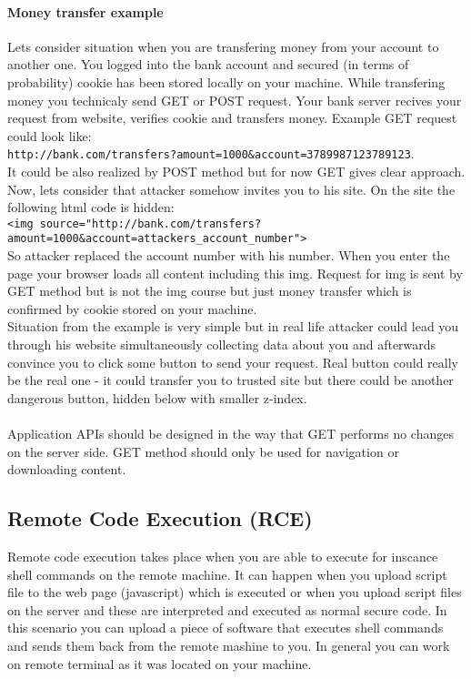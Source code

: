 \documentclass{article}[12pt]
\begin{document}
\paragraph{Money transfer example} Lets consider situation when you are transfering money from your account to another one. You logged into the bank account and secured (in terms of probability) cookie has been stored locally on your machine. While transfering money you technicaly send GET or POST request. Your bank server recives your request from website, verifies cookie and transfers money. Example GET request could look like: \\
\texttt{http://bank.com/transfers?amount=1000\&account=3789987123789123}. \\
It could be also realized by POST method but for now GET gives clear approach. Now, lets consider that attacker somehow invites you to his site. On the site the following html code is hidden: \\
\texttt{<img source="http://bank.com/transfers?amount=1000\&account=attackers\_account\_number">}\\
So attacker replaced the account number with his number. When you enter the page your browser loads all content including this img. Request for img is sent by GET method but is not the img course but just money transfer which is confirmed by cookie stored on your machine.\\

Situation from the example is very simple but in real life attacker could lead you through his website simultaneously collecting data about you and afterwards convince you to click some button to send your request. Real button could really be the real one - it could transfer you to trusted site but there could be another dangerous button, hidden below with smaller z-index. \\\\
Application APIs should be designed in the way that GET performs no changes on the server side. GET method should only be used for navigation or downloading content.



\subsection{Remote Code Execution (RCE)}
Remote code execution takes place when you are able to execute for inscance shell commands on the remote
machine. It can happen when you upload script file to the web page (javascript) which is executed or when you
upload script files on the server and these are interpreted and executed as normal secure code. In this
scenario you can upload a piece of software that executes shell commands and sends them back from the remote mashine
to you. In general you can work on remote terminal as it was located on your machine.
\end{document}

